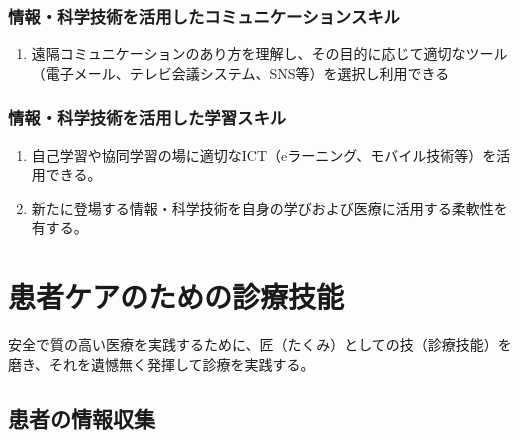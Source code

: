 \documentclass[
]{ltjsarticle}
\providecommand{\tightlist}{%
  \setlength{\itemsep}{0pt}\setlength{\parskip}{0pt}}
\begin{document}
\hypertarget{ux60c5ux5831ux79d1ux5b66ux6280ux8853ux3092ux6d3bux7528ux3057ux305fux30b3ux30dfux30e5ux30cbux30b1ux30fcux30b7ux30e7ux30f3ux30b9ux30adux30eb}{%
\subsubsection{情報・科学技術を活用したコミュニケーションスキル}\label{ux60c5ux5831ux79d1ux5b66ux6280ux8853ux3092ux6d3bux7528ux3057ux305fux30b3ux30dfux30e5ux30cbux30b1ux30fcux30b7ux30e7ux30f3ux30b9ux30adux30eb}}

\begin{enumerate}
\def\labelenumi{\arabic{enumi}.}
\tightlist
\item
  遠隔コミュニケーションのあり方を理解し、その目的に応じて適切なツール（電子メール、テレビ会議システム、SNS等）を選択し利用できる
\end{enumerate}

\hypertarget{ux60c5ux5831ux79d1ux5b66ux6280ux8853ux3092ux6d3bux7528ux3057ux305fux5b66ux7fd2ux30b9ux30adux30eb}{%
\subsubsection{情報・科学技術を活用した学習スキル}\label{ux60c5ux5831ux79d1ux5b66ux6280ux8853ux3092ux6d3bux7528ux3057ux305fux5b66ux7fd2ux30b9ux30adux30eb}}

\begin{enumerate}
\def\labelenumi{\arabic{enumi}.}
\tightlist
\item
  自己学習や協同学習の場に適切なICT（eラーニング、モバイル技術等）を活用できる。
\item
  新たに登場する情報・科学技術を自身の学びおよび医療に活用する柔軟性を有する。
\end{enumerate}

\newpage

\hypertarget{ux60a3ux8005ux30b1ux30a2ux306eux305fux3081ux306eux8a3aux7642ux6280ux80fd}{%
\section{患者ケアのための診療技能}\label{ux60a3ux8005ux30b1ux30a2ux306eux305fux3081ux306eux8a3aux7642ux6280ux80fd}}

安全で質の高い医療を実践するために、匠（たくみ）としての技（診療技能）を磨き、それを遺憾無く発揮して診療を実践する。

\hypertarget{ux60a3ux8005ux306eux60c5ux5831ux53ceux96c6}{%
\subsection{患者の情報収集}\label{ux60a3ux8005ux306eux60c5ux5831ux53ceux96c6}}
\end{document}
